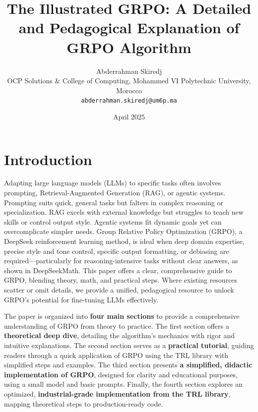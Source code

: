 \documentclass{article}
\title{The Illustrated GRPO: A Detailed and Pedagogical Explanation of GRPO Algorithm}
\author{
  {\Large Abderrahman Skiredj} \\
  \vspace{0.2em}
  {\small OCP Solutions \& College of Computing, Mohammed VI Polytechnic University, Morocco} \\
  {\small \texttt{abderrahman.skiredj@um6p.ma}}
}
\date{April 2025}
\begin{document}
\maketitle

\section*{Introduction}

Adapting large language models (LLMs) to specific tasks often involves prompting, Retrieval-Augmented Generation (RAG), or agentic systems. Prompting suits quick, general tasks but falters in complex reasoning or specialization. RAG excels with external knowledge but struggles to teach new skills or control output style. Agentic systems fit dynamic goals yet can overcomplicate simpler needs. Group Relative Policy Optimization (GRPO), a DeepSeek reinforcement learning method, is ideal when deep domain expertise, precise style and tone control, specific output formatting, or debiasing are required—particularly for reasoning-intensive tasks without clear answers, as shown in DeepSeekMath. This paper offers a clear, comprehensive guide to GRPO, blending theory, math, and practical steps. Where existing resources scatter or omit details, we provide a unified, pedagogical resource to unlock GRPO’s potential for fine-tuning LLMs effectively.

The paper is organized into \textbf{four main sections} to provide a comprehensive understanding of GRPO from theory to practice. The first section offers a \textbf{theoretical deep dive}, detailing the algorithm’s mechanics with rigor and intuitive explanations. The second section serves as a \textbf{practical tutorial}, guiding readers through a quick application of GRPO using the TRL library with simplified steps and examples. The third section presents \textbf{a simplified, didactic implementation of GRPO}, designed for clarity and educational purposes, using a small model and basic prompts. Finally, the fourth section explores an optimized, \textbf{industrial-grade implementation from the TRL library}, mapping theoretical steps to production-ready code.
\end{document}
